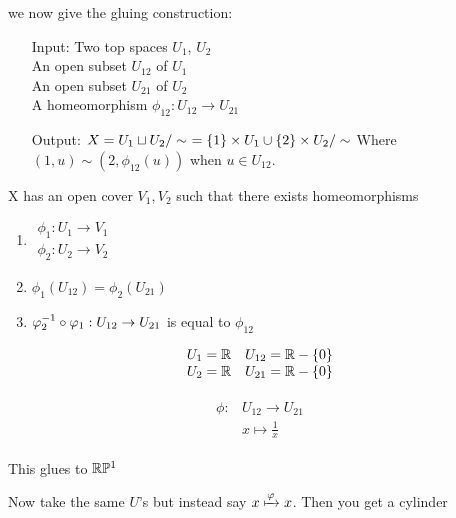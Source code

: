 \documentclass[12pt, twosided]{article}
\begin{document}
we now give the gluing construction:

\begin{itemize}
\item [Input:] Two top spaces \(U_1\), \(U_2\) \\
  An open subset \(U_{12}\) of \(U_1\)\\
  An open subset \(U_{21}\) of \(U_2\)\\
  A homeomorphism \(\phi_{12}: U_{12} \to U_{21}\)
\item [Output:] \(X = U_1 \sqcup U_2 / \sim\ = \opn 1 \cls \times U_1 \cup \opn 2 \cls \times U_2 / \sim \) Where \((1, u) \sim (2, \phi_{12}(u))\) when \(u \in U_{12}\).
\end{itemize}

\begin{thm}
  X has an open cover \(V_1, V_2\) such that there exists homeomorphisms

  \begin{enumerate}
  \item
    \(\begin{matrix}
      \phi_1: U_1 \to V_1 \\
      \phi_2: U_2 \to V_2
    \end{matrix}\)
  \item\(\phi_1(U_{12}) = \phi_2(U_{21})\)
  \item \(\phi\1_2 \circ \phi_1 : U_{12} \to U_{21}\) is equal to \(\phi_{12}\)
  \end{enumerate}
\end{thm}

\begin{exa}
  \begin{align*}
    \begin{matrix}
      U_1 = \R & U_{12} = \R - \opn 0 \cls \\
      U_2 = \R & U_{21} = \R - \opn 0 \cls
    \end{matrix}
  \end{align*}

  \begin{align*}
    \begin{matrix}
      \phi:&U_{12} \to U_{21} \\
           &x \mapsto \frac{1}{x}
    \end{matrix}
  \end{align*}

  This glues to \(\R\P^1\) 
\end{exa}

\begin{exa}
  Now take the same \(U\)'s but instead say \(x \xmapsto{\phi} x\). Then you get a cylinder
\end{exa}
\end{document}
